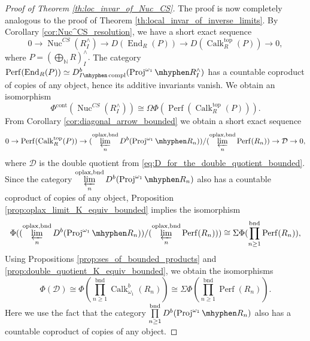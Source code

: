 \documentclass[11pt,leqno]{amsart}
\numberwithin{equation}{section}
\def\N{\mathbb{N}}
\def\End{\operatorname{End}}
\newcommand{\hy}{\mhyphen}
\newcommand{\prolim}[1][]{\mathop{\varprojlim}\limits_{#1}}
\newcommand{\biggplus}[1][]{\mathop{\bigoplus}\limits_{#1}}
\newcommand{\prodd}[1][]{\mathop{\prod}\limits_{#1}}
\newcommand{\bnd}{\operatorname{bnd}}
\newcommand{\oplax}{\operatorname{oplax}}
\newcommand{\Nuc}{\operatorname{Nuc}}
\newcommand{\Proj}{\operatorname{Proj}}
\newcommand{\cont}{\operatorname{cont}}
\newcommand{\cD}{{\mathcal D}}
\newcommand{\topp}{\operatorname{top}}
\newcommand{\Perf}{\operatorname{Perf}}
\newcommand{\Calk}{\operatorname{Calk}}
\newcommand{\compl}{\operatorname{compl}}
\begin{document}
\begin{proof}[Proof of Theorem \ref{th:loc_invar_of_Nuc_CS}] The proof is now completely analogous to the proof of Theorem \ref{th:local_invar_of_inverse_limits}.
By Corollary \ref{cor:Nuc^CS_resolution}, we have a short exact sequence
\begin{equation*}
0\to \Nuc^{CS}(R^{\wedge}_I)\to D(\End_R(P))\to D(\Calk_R^{\topp}(P))\to 0,
\end{equation*}
where $P=(\biggplus[\N]R)^{\wedge}_I.$ The category $\Perf(\End_R(P))\simeq D^b_{I\hy\compl}(\Proj^{\omega_1}\hy R^{\wedge}_I)$ has a countable coproduct of copies of any object, hence its additive invariants vanish. We obtain an isomorphism
\begin{equation*}
\Phi^{\cont}(\Nuc^{CS}(R^{\wedge}_I))\cong \Omega\Phi(\Perf(\Calk_R^{\topp}(P))).
\end{equation*}
From Corollary \ref{cor:diagonal_arrow_bounded} we obtain a short exact sequence
\begin{equation*}
0\to \Perf(\Calk_R^{\topp}(P))\to (\prolim[n]^{\oplax,\bnd} D^b(\Proj^{\omega_1}\hy R_n))/(\prolim[n]^{\oplax,\bnd} \Perf(R_n))\to \cD\to 0,
\end{equation*}
where $\cD$ is the double quotient from \eqref{eq:D_for_the_double_quotient_bounded}. Since the category $\prolim[n]^{\oplax,\bnd} D^b(\Proj^{\omega_1}\hy R_n)$ also has a countable coproduct of copies of any object, Proposition \ref{prop:oplax_limit_K_equiv_bounded}  implies the isomorphism \begin{equation*}
	\Phi((\prolim[n]^{\oplax,\bnd} D^b(\Proj^{\omega_1}\hy R_n))/(\prolim[n]^{\oplax,\bnd} \Perf(R_n)))\cong \Sigma\Phi(\prodd[n\geq 1]^{\bnd}\Perf(R_n)),
\end{equation*}
Using Propositions \ref{prop:ses_of_bounded_products} and \ref{prop:double_quotient_K_equiv_bounded}, we obtain the isomorphisms
\begin{equation*}
\Phi(\cD)\cong \Phi(\prodd[n\geq 1]^{\bnd}\Calk_{\omega_1}^b(R_n))\cong \Sigma\Phi(\prodd[n\geq 1]^{\bnd}\Perf(R_n)).
\end{equation*}
Here we use the fact that the category $\prodd[n\geq 1]^{\bnd}D^b(\Proj^{\omega_1}\hy R_n)$ also has a countable coproduct of copies of any object.


\end{proof}
\end{document}
